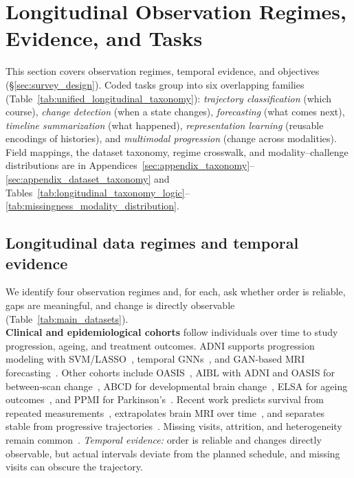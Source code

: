 \documentclass[11pt]{article}
\newcommand{\xref}[2]{
\hyperref[#1]{\underline{\textcolor{blue}{#2~\ref*{#1}}}}}
\theoremstyle{plain}
\theoremstyle{definition}
\theoremstyle{remark}
\begin{document}
\section{Longitudinal Observation Regimes, Evidence, and Tasks}
\label{sec:data_landscape}
\noindent This section covers observation regimes, temporal evidence, and objectives (\S\ref{sec:survey_design}). Coded tasks group into six overlapping families (Table~\ref{tab:unified_longitudinal_taxonomy}): \emph{trajectory classification} (which course), \emph{change detection} (when a state changes), \emph{forecasting} (what comes next), \emph{timeline summarization} (what happened), \emph{representation learning} (reusable encodings of histories), and \emph{multimodal progression} (change across modalities). Field mappings, the dataset taxonomy, regime crosswalk, and modality--challenge distributions are in Appendices~\ref{sec:appendix_taxonomy}--\ref{sec:appendix_dataset_taxonomy} and Tables~\ref{tab:longitudinal_taxonomy_logic}--\ref{tab:missingness_modality_distribution}.%

\subsection{Longitudinal data regimes and temporal evidence}
We identify four observation regimes and, for each, ask whether order is reliable, gaps are meaningful, and change is directly observable (Table~\ref{tab:main_datasets}).\\
\noindent\textbf{Clinical and epidemiological cohorts} follow individuals over time to study progression, ageing, and treatment outcomes. ADNI supports progression modeling with SVM/LASSO~\cite{9377173,8857827}, temporal GNNs~\cite{9669504}, and GAN-based MRI forecasting~\cite{10489807}. Other cohorts include OASIS~\cite{10959402}, AIBL with ADNI and OASIS for between-scan change~\cite{10483639}, ABCD for developmental brain change~\cite{10340079,10313489}, ELSA for ageing outcomes~\cite{9308198}, and PPMI for Parkinson's~\cite{10340372}. Recent work predicts survival from repeated measurements~\citep{11373479}, extrapolates brain MRI over time~\citep{11437527}, and separates stable from progressive trajectories~\citep{10969769}. Missing visits, attrition, and heterogeneity remain common~\cite{10796324,10415852,9374343,8759198,10635519,9983643,10069449}. \emph{Temporal evidence:} order is reliable and changes directly observable, but actual intervals deviate from the planned schedule, and missing visits can obscure the trajectory.
\end{document}
